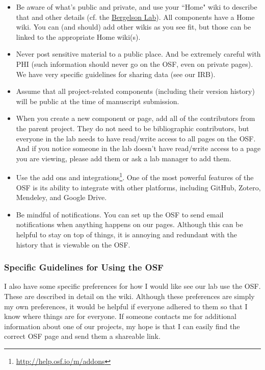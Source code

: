 \documentclass[letterpaper,12pt,oneside]{memoir}
\begin{document}
\begin{itemize}
\item Be aware of what's public and private, and use your ``Home" wiki to describe that and other details (cf. the \href{https://osf.io/3qg96/}{Bergelson Lab}). All components have a Home wiki. You can (and should) add other wikis as you see fit, but those can be linked to the appropriate Home wiki(s).

\item Never post sensitive material to a public place. And be extremely careful with PHI (such information should never go on the OSF, even on private pages). We have very specific guidelines for sharing data (see our IRB). 

\item Assume that all project-related components (including their version history) will be public at the time of manuscript submission. 

\item When you create a new component or page, add all of the contributors from the parent project. They do not need to be bibliographic contributors, but everyone in the lab needs to have read/write access to all pages on the OSF. And if you notice someone in the lab doesn't have read/write access to a page you are viewing, please add them or ask a lab manager to add them. 

\item Use the add ons and integrations\footnote{\url{http://help.osf.io/m/addons}}. One of the most powerful features of the OSF is its ability to integrate with other platforms, including GitHub, Zotero, Mendeley, and Google Drive. 

\item Be mindful of notifications. You can set up the OSF to send email notifications when anything happens on our pages. Although this can be helpful to stay on top of things, it is annoying and redundant with the history that is viewable on the OSF. 

\end{itemize}

\subsubsection{Specific Guidelines for Using the OSF}

I also have some specific preferences for how I would like see our lab use the OSF. These are described in detail on the wiki. Although these preferences  are simply my own preferences, it would be helpful if everyone adhered to them so that I know where things are for everyone. If someone contacts me for additional information about one of our projects, my hope is that I can easily find the correct OSF page and send them a shareable link.
\end{document}

